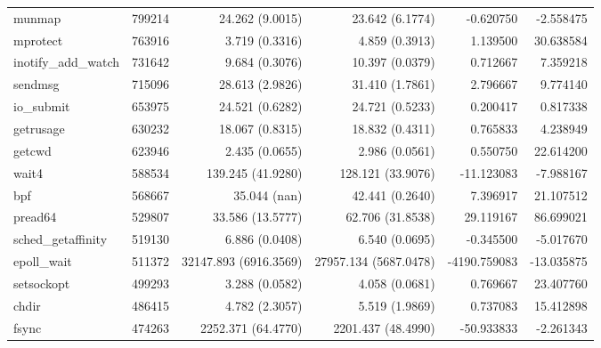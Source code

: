 \begin{longtable}{>{\ttfamily}lrrrrr}
                         munmap &     799214 &          24.262 (9.0015) &          23.642 (6.1774) &       -0.620750 &    -2.558475 \\
                       mprotect &     763916 &           3.719 (0.3316) &           4.859 (0.3913) &        1.139500 &    30.638584 \\
            inotify\_add\_watch &     731642 &           9.684 (0.3076) &          10.397 (0.0379) &        0.712667 &     7.359218 \\
                        sendmsg &     715096 &          28.613 (2.9826) &          31.410 (1.7861) &        2.796667 &     9.774140 \\
                     io\_submit &     653975 &          24.521 (0.6282) &          24.721 (0.5233) &        0.200417 &     0.817338 \\
                      getrusage &     630232 &          18.067 (0.8315) &          18.832 (0.4311) &        0.765833 &     4.238949 \\
                         getcwd &     623946 &           2.435 (0.0655) &           2.986 (0.0561) &        0.550750 &    22.614200 \\
                          wait4 &     588534 &        139.245 (41.9280) &        128.121 (33.9076) &      -11.123083 &    -7.988167 \\
                            bpf &     568667 &             35.044 (nan) &          42.441 (0.2640) &        7.396917 &    21.107512 \\
                        pread64 &     529807 &         33.586 (13.5777) &         62.706 (31.8538) &       29.119167 &    86.699021 \\
             sched\_getaffinity &     519130 &           6.886 (0.0408) &           6.540 (0.0695) &       -0.345500 &    -5.017670 \\
                    epoll\_wait &     511372 &    32147.893 (6916.3569) &    27957.134 (5687.0478) &    -4190.759083 &   -13.035875 \\
                     setsockopt &     499293 &           3.288 (0.0582) &           4.058 (0.0681) &        0.769667 &    23.407760 \\
                          chdir &     486415 &           4.782 (2.3057) &           5.519 (1.9869) &        0.737083 &    15.412898 \\
                          fsync &     474263 &       2252.371 (64.4770) &       2201.437 (48.4990) &      -50.933833 &    -2.261343 \\

\end{longtable}
